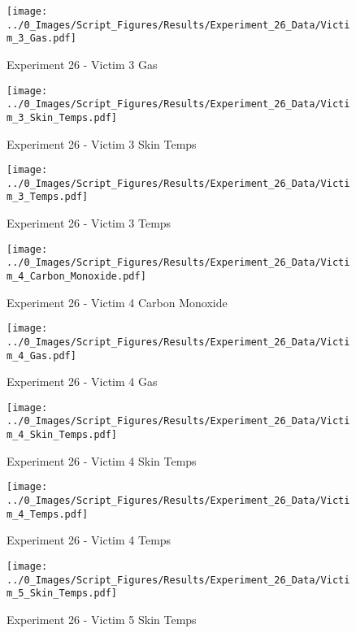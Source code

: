 	\begin{figure}[H]
		\centering
		\texttt{[image: ../0\_Images/Script\_Figures/Results/Experiment\_26\_Data/Victim\_3\_Gas.pdf]}
		\caption[]{Experiment 26 - Victim 3 Gas}
	\end{figure}
 
	\clearpage

	\begin{figure}[H]
		\centering
		\texttt{[image: ../0\_Images/Script\_Figures/Results/Experiment\_26\_Data/Victim\_3\_Skin\_Temps.pdf]}
		\caption[]{Experiment 26 - Victim 3 Skin Temps}
	\end{figure}
 

	\begin{figure}[H]
		\centering
		\texttt{[image: ../0\_Images/Script\_Figures/Results/Experiment\_26\_Data/Victim\_3\_Temps.pdf]}
		\caption[]{Experiment 26 - Victim 3 Temps}
	\end{figure}
 
	\clearpage

	\begin{figure}[H]
		\centering
		\texttt{[image: ../0\_Images/Script\_Figures/Results/Experiment\_26\_Data/Victim\_4\_Carbon\_Monoxide.pdf]}
		\caption[]{Experiment 26 - Victim 4 Carbon Monoxide}
	\end{figure}
 

	\begin{figure}[H]
		\centering
		\texttt{[image: ../0\_Images/Script\_Figures/Results/Experiment\_26\_Data/Victim\_4\_Gas.pdf]}
		\caption[]{Experiment 26 - Victim 4 Gas}
	\end{figure}
 
	\clearpage

	\begin{figure}[H]
		\centering
		\texttt{[image: ../0\_Images/Script\_Figures/Results/Experiment\_26\_Data/Victim\_4\_Skin\_Temps.pdf]}
		\caption[]{Experiment 26 - Victim 4 Skin Temps}
	\end{figure}
 

	\begin{figure}[H]
		\centering
		\texttt{[image: ../0\_Images/Script\_Figures/Results/Experiment\_26\_Data/Victim\_4\_Temps.pdf]}
		\caption[]{Experiment 26 - Victim 4 Temps}
	\end{figure}
 
	\clearpage

	\begin{figure}[H]
		\centering
		\texttt{[image: ../0\_Images/Script\_Figures/Results/Experiment\_26\_Data/Victim\_5\_Skin\_Temps.pdf]}
		\caption[]{Experiment 26 - Victim 5 Skin Temps}
	\end{figure}
 

